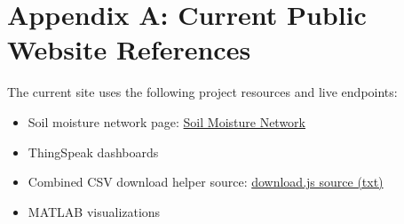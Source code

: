 \documentclass[11pt]{article}
\begin{document}
\section{Appendix A: Current Public Website References}
The current site uses the following project resources and live endpoints:
\begin{itemize}
    \item Soil moisture network page: \href{https://benmiller.us/projects/soil-moisture-network.html}{Soil Moisture Network}
    \item ThingSpeak dashboards
    \item Combined CSV download helper source: \href{https://benmiller.us/assets/download-source.txt}{download.js source (txt)}
    \item MATLAB visualizations
\end{itemize}
\end{document}
